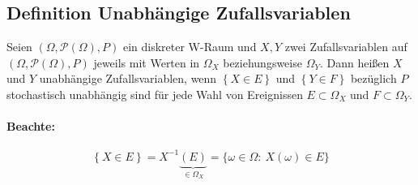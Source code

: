 \documentclass[12pt,a4paper]{article}
\begin{document}
	\subsection{Definition Unabhängige Zufallsvariablen}
	Seien $(\Omega,\mathcal{P}(\Omega),P)$ ein diskreter W-Raum und $X,Y$ zwei Zufallsvariablen auf $(\Omega,\mathcal{P}(\Omega),P)$ jeweils mit Werten in $\Omega_X$ beziehungsweise $\Omega_Y$. Dann heißen $X$ und $Y$ unabhängige Zufallsvariablen, wenn $\left\{X\in E\right\}$ und $\left\{Y\in F\right\}$ bezüglich $P$ stochastisch unabhängig sind für jede Wahl von Ereignissen $E\subset\Omega_X$ und $F\subset\Omega_Y$.
	\paragraph{Beachte:}
	$$\left\{X\in E\right\}=X^{-1}\underbrace{\left(E\right)}_{\in\Omega_X}=\{\omega\in\Omega:\: X(\omega)\in E\}$$  
	
	
		 	
 	
 	
 	
 	
 	
 	
 	
 	
 	
 	
 	
 	
 	
 	
 	
 	
 	
\end{document}
